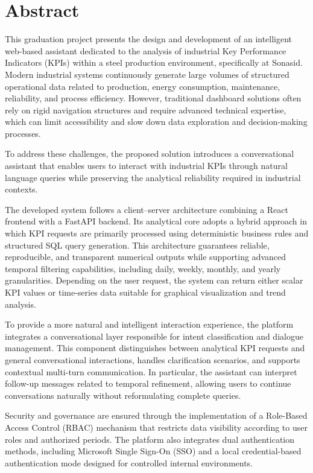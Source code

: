 \documentclass[12pt,a4paper,openany]{report}
\begin{document}
\chapter*{Abstract}
This graduation project presents the design and development of an intelligent web-based assistant dedicated to the analysis of industrial Key Performance Indicators (KPIs) within a steel production environment, specifically at Sonasid. Modern industrial systems continuously generate large volumes of structured operational data related to production, energy consumption, maintenance, reliability, and process efficiency. However, traditional dashboard solutions often rely on rigid navigation structures and require advanced technical expertise, which can limit accessibility and slow down data exploration and decision-making processes.

To address these challenges, the proposed solution introduces a conversational assistant that enables users to interact with industrial KPIs through natural language queries while preserving the analytical reliability required in industrial contexts.

The developed system follows a client--server architecture combining a React frontend with a FastAPI backend. Its analytical core adopts a hybrid approach in which KPI requests are primarily processed using deterministic business rules and structured SQL query generation. This architecture guarantees reliable, reproducible, and transparent numerical outputs while supporting advanced temporal filtering capabilities, including daily, weekly, monthly, and yearly granularities. Depending on the user request, the system can return either scalar KPI values or time-series data suitable for graphical visualization and trend analysis.

To provide a more natural and intelligent interaction experience, the platform integrates a conversational layer responsible for intent classification and dialogue management. This component distinguishes between analytical KPI requests and general conversational interactions, handles clarification scenarios, and supports contextual multi-turn communication. In particular, the assistant can interpret follow-up messages related to temporal refinement, allowing users to continue conversations naturally without reformulating complete queries.

Security and governance are ensured through the implementation of a Role-Based Access Control (RBAC) mechanism that restricts data visibility according to user roles and authorized periods. The platform also integrates dual authentication methods, including Microsoft Single Sign-On (SSO) and a local credential-based authentication mode designed for controlled internal environments.
\end{document}
